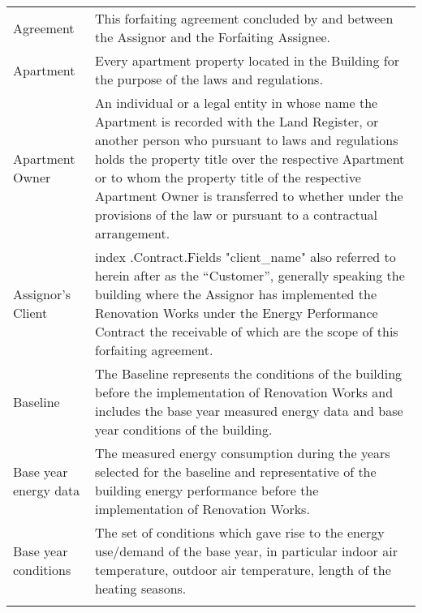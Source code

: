 \documentclass[a4paper]{article}
\begin{document}
\begin{longtabu}{|X|X[2]|} \tabucline{}


   Agreement & This forfaiting agreement concluded by and between the
   Assignor and the Forfaiting Assignee. \\\tabucline{}

   \hline

   Apartment & Every apartment property located in the Building for the
   purpose of the laws and regulations. \\\tabucline{}

   \hline

   Apartment Owner & An individual or a legal entity in whose name the
   Apartment is recorded with the Land Register, or another person who
   pursuant to laws and regulations holds the property title over the
   respective Apartment or to whom the property title of the respective
   Apartment Owner is transferred to whether under the provisions of
   the law or pursuant to a contractual arrangement. \\\tabucline{}

   \hline

   Assignor’s Client &  {{index .Contract.Fields "client_name"}} also referred to herein after as the
   “Customer”, generally speaking the building where the Assignor has
   implemented the Renovation Works under the Energy Performance
   Contract the receivable of which are the scope of this forfaiting
   agreement.\\\tabucline{}

   \hline

   Baseline & The Baseline represents the conditions of the building
   before the implementation of Renovation Works and includes the base
   year measured energy data and base year conditions of the building. \\\tabucline{}

   \hline

   Base year energy data & The measured energy consumption during the
   years selected for the baseline and representative of the building
   energy performance before the implementation of Renovation Works. \\\tabucline{}

   \hline

   Base year conditions & The set of conditions which gave rise to the
   energy use/demand of the base year, in particular indoor air
   temperature, outdoor air temperature, length of the heating seasons. \\\tabucline{}


\end{longtabu}
\end{document}
